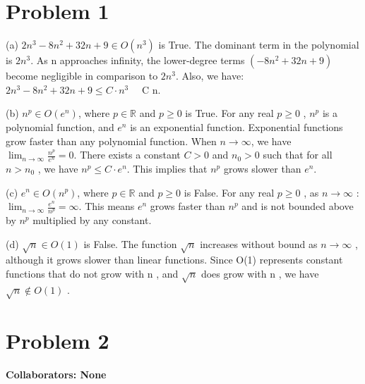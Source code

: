\documentclass[12 pt]{article}
\begin{document}
\section*{Problem 1}

(a) $2n^3 - 8n^2 + 32n + 9 \in O(n^3)$ is True. The dominant term in the polynomial is $2n^3$. As n approaches infinity, the lower-degree terms $(-8n^2 + 32n + 9)$ become negligible in comparison to $2n^3$. Also, we have: $2n^3 - 8n^2 + 32n + 9 \leq C \cdot n^3 \quad$  C  n.

(b) $n^p \in O(e^n)$, where  $p \in \mathbb{R}$  and  $p \geq 0$ is True. For any real  $p \geq 0$ ,  $n^p$  is a polynomial function, and  $e^n$  is an exponential function. Exponential functions grow faster than any polynomial function. When $n \to \infty$, we have $\lim_{n \to \infty} \frac{n^p}{e^n} = 0$. There exists a constant  $C > 0$  and  $n_0 > 0$  such that for all  $n > n_0$ , we have  $n^p \leq C \cdot e^n$. This implies that  $n^p$  grows slower than  $e^n$.

(c) $e^n \in O(n^p)$, where  $p \in \mathbb{R}$  and  $p \geq 0$ 
is False. For any real  $p \geq 0$ , as  $n \to \infty$ :
$\lim_{n \to \infty} \frac{e^n}{n^p} = \infty$. This means  $e^n$  grows faster than  $n^p$  and is not bounded above by  $n^p$  multiplied by any constant.

(d)  $\sqrt{n} \in O(1)$ is False. The function  $\sqrt{n}$  increases without bound as  $n \to \infty$ , although it grows slower than linear functions. Since  O(1)  represents constant functions that do not grow with  n , and  $\sqrt{n}$  does grow with  n , we have  $\sqrt{n} \notin O(1)$ .

\vspace{1cm}

\section*{Problem 2}



\vspace{1cm}



\noindent\textbf{Collaborators: None}
\end{document}
